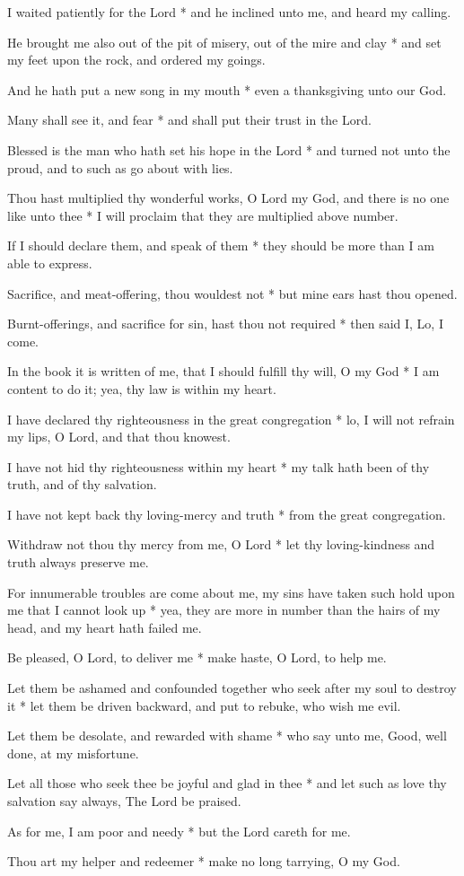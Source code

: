 I waited patiently for the Lord * and he inclined unto me, and heard my calling.

He brought me also out of the pit of misery, out of the mire and clay * and set my feet upon the rock, and ordered my goings.

And he hath put a new song in my mouth * even a thanksgiving unto our God.

Many shall see it, and fear * and shall put their trust in the Lord.

Blessed is the man who hath set his hope in the Lord * and turned not unto the proud, and to such as go about with lies.

Thou hast multiplied thy wonderful works, O Lord my God, and there is no one like unto thee * I will proclaim that they are multiplied above number.

If I should declare them, and speak of them * they should be more than I am able to express.

Sacrifice, and meat-offering, thou wouldest not * but mine ears hast thou opened.

Burnt-offerings, and sacrifice for sin, hast thou not required * then said I, Lo, I come.

In the book it is written of me, that I should fulfill thy will, O my God * I am content to do it; yea, thy law is within my heart.

I have declared thy righteousness in the great congregation * lo, I will not refrain my lips, O Lord, and that thou knowest.

I have not hid thy righteousness within my heart * my talk hath been of thy truth, and of thy salvation.

I have not kept back thy loving-mercy and truth * from the great congregation.

Withdraw not thou thy mercy from me, O Lord * let thy loving-kindness and truth always preserve me.

For innumerable troubles are come about me, my sins have taken such hold upon me that I cannot look up * yea, they are more in number than the hairs of my head, and my heart hath failed me.

Be pleased, O Lord, to deliver me * make haste, O Lord, to help me.

Let them be ashamed and confounded together who seek after my soul to destroy it * let them be driven backward, and put to rebuke, who wish me evil.

Let them be desolate, and rewarded with shame * who say unto me, Good, well done, at my misfortune.

Let all those who seek thee be joyful and glad in thee * and let such as love thy salvation say always, The Lord be praised.

As for me, I am poor and needy * but the Lord careth for me.

Thou art my helper and redeemer * make no long tarrying, O my God.